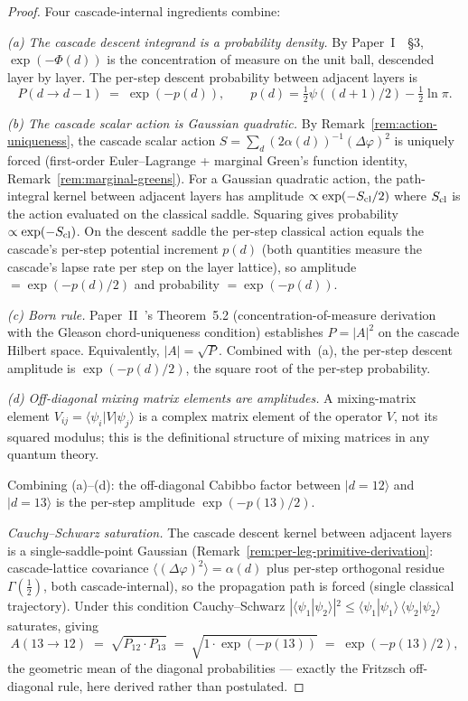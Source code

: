 \documentclass[12pt,a4paper]{article}
\begin{document}
\begin{proof}
Four cascade-internal ingredients combine:

\emph{(a) The cascade descent integrand is a probability density.} By
Paper~I~\cite{part0}~\S3, $\exp(-\Phi(d))$ is the concentration of
measure on the unit ball, descended layer by layer.  The per-step
descent probability between adjacent layers is
\[
P(d\to d-1) \;=\; \exp(-p(d)),
\qquad
p(d) = \tfrac{1}{2}\psi((d+1)/2)-\tfrac{1}{2}\ln\pi.
\]

\emph{(b) The cascade scalar action is Gaussian quadratic.} By
Remark~\ref{rem:action-uniqueness}, the cascade scalar action $S =
\sum_d (2\alpha(d))^{-1}(\Delta\varphi)^2$ is uniquely forced
(first-order Euler--Lagrange + marginal Green's function identity,
Remark~\ref{rem:marginal-greens}).  For a Gaussian quadratic action,
the path-integral kernel between adjacent layers has amplitude
$\propto\exp(-S_{\rm cl}/2)$ where $S_{\rm cl}$ is the action evaluated
on the classical saddle.  Squaring gives probability $\propto
\exp(-S_{\rm cl})$.  On the descent saddle the per-step classical
action equals the cascade's per-step potential increment $p(d)$ (both
quantities measure the cascade's lapse rate per step on the layer
lattice), so amplitude $=\exp(-p(d)/2)$ and probability $=\exp(-p(d))$.

\emph{(c) Born rule.} Paper~II~\cite{part2}'s Theorem~5.2
(concentration-of-measure derivation with the Gleason chord-uniqueness
condition) establishes $P=|A|^2$ on the cascade Hilbert space.
Equivalently, $|A|=\sqrt{P}$.  Combined with~(a), the per-step descent
amplitude is $\exp(-p(d)/2)$, the square root of the per-step
probability.

\emph{(d) Off-diagonal mixing matrix elements are amplitudes.} A
mixing-matrix element $V_{ij} = \langle\psi_i|V|\psi_j\rangle$ is a
complex matrix element of the operator $V$, not its squared modulus;
this is the definitional structure of mixing matrices in any quantum
theory.

Combining (a)--(d): the off-diagonal Cabibbo factor between
$|d=12\rangle$ and $|d=13\rangle$ is the per-step amplitude
$\exp(-p(13)/2)$.

\emph{Cauchy--Schwarz saturation.} The cascade descent kernel between
adjacent layers is a single-saddle-point Gaussian
(Remark~\ref{rem:per-leg-primitive-derivation}: cascade-lattice covariance
$\langle(\Delta\varphi)^2\rangle=\alpha(d)$ plus per-step orthogonal
residue $\Gamma(\tfrac12)$, both cascade-internal),
so the propagation path is forced (single classical trajectory).  Under
this condition Cauchy--Schwarz $|\langle\psi_1|\psi_2\rangle|^2\le
\langle\psi_1|\psi_1\rangle\,\langle\psi_2|\psi_2\rangle$ saturates,
giving
\[
A(13\to 12)
\;=\; \sqrt{P_{12}\cdot P_{13}}
\;=\; \sqrt{1\cdot\exp(-p(13))}
\;=\; \exp(-p(13)/2),
\]
the geometric mean of the diagonal probabilities --- exactly the
Fritzsch off-diagonal rule, here derived rather than postulated.
\end{proof}
\end{document}
